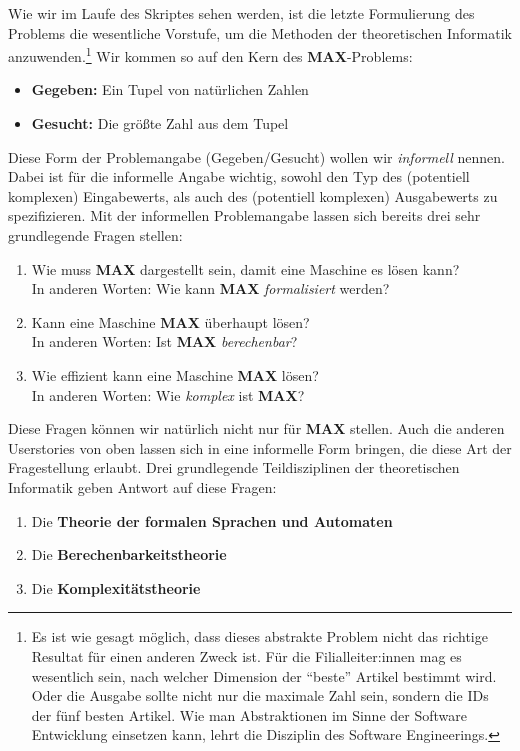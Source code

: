 Wie wir im Laufe des Skriptes sehen werden, ist die letzte Formulierung des Problems die 
wesentliche Vorstufe, um die Methoden der theoretischen Informatik anzuwenden.\footnote{
Es ist wie gesagt möglich,
dass dieses abstrakte Problem nicht das richtige Resultat für einen anderen Zweck ist.
Für die Filialleiter:innen mag es wesentlich sein,
nach welcher Dimension der ``beste'' Artikel bestimmt wird.
Oder die Ausgabe sollte nicht nur die maximale Zahl sein, sondern die IDs der
fünf besten Artikel.
Wie man Abstraktionen im Sinne der Software Entwicklung einsetzen kann,
lehrt die Disziplin des Software Engineerings.}
Wir kommen so auf den Kern des \textbf{MAX}-Problems:
\begin{itemize}
    \item \textbf{Gegeben:} Ein Tupel von natürlichen Zahlen
    \item \textbf{Gesucht:} Die größte Zahl aus dem Tupel
\end{itemize}
Diese Form der Problemangabe (Gegeben/Gesucht) wollen wir \emph{informell} nennen.
Dabei ist für die informelle Angabe wichtig,
sowohl den Typ des (potentiell komplexen) Eingabewerts,
als auch des (potentiell komplexen) Ausgabewerts zu spezifizieren.
Mit der informellen Problemangabe lassen sich bereits drei sehr grundlegende Fragen stellen:
\begin{enumerate}
    \item Wie muss \textbf{MAX} dargestellt sein, damit eine Maschine es lösen kann?\\ 
        In anderen Worten: Wie kann \textbf{MAX} \emph{formalisiert} werden? 
    \item Kann eine Maschine \textbf{MAX} überhaupt lösen?\\
        In anderen Worten: Ist \textbf{MAX} \emph{berechenbar}?  
    \item Wie effizient kann eine Maschine \textbf{MAX} lösen?\\
        In anderen Worten: Wie \emph{komplex} ist \textbf{MAX}?
\end{enumerate}
Diese Fragen können wir natürlich nicht nur für \textbf{MAX} stellen.
Auch die anderen Userstories von oben lassen sich in eine informelle Form bringen,
die diese Art der Fragestellung erlaubt.
Drei grundlegende Teildisziplinen der theoretischen Informatik
geben Antwort auf diese Fragen:
\begin{enumerate}
    \item Die \textbf{Theorie der formalen Sprachen und Automaten}
    \item Die \textbf{Berechenbarkeitstheorie}
    \item Die \textbf{Komplexitätstheorie}
\end{enumerate}

